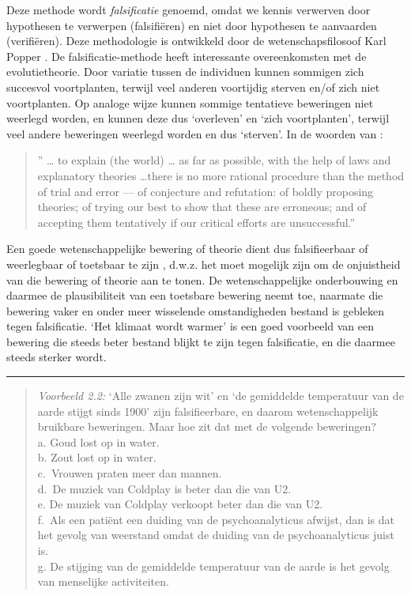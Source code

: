 \documentclass[
]{book}
\begin{document}
Deze methode wordt \emph{falsificatie} genoemd, omdat we kennis verwerven
door hypothesen te verwerpen (falsifiëren) en niet door hypothesen te
aanvaarden (verifiëren). Deze methodologie is ontwikkeld door de
wetenschapsfilosoof Karl Popper \citep{Popp35, Popp59, Popp63}. De
falsificatie-methode heeft interessante overeenkomsten met de
evolutietheorie. Door variatie tussen de individuen kunnen sommigen zich
succesvol voortplanten, terwijl veel anderen voortijdig sterven en/of
zich niet voortplanten. Op analoge wijze kunnen sommige tentatieve
beweringen niet weerlegd worden, en kunnen deze dus `overleven' en `zich
voortplanten', terwijl veel andere beweringen weerlegd worden en dus
`sterven'. In de woorden van \citep[p.51]{Popp63}:

\begin{quote}
'' \ldots{} to explain (the world) \ldots{} as far as possible, with the help of laws and explanatory theories \ldots there is no more rational procedure than the method of trial and error --- of conjecture and refutation: of boldly proposing theories; of trying our best to show that these are erroneous; and of accepting them tentatively if our critical efforts are unsuccessful.''
\end{quote}

Een goede wetenschappelijke bewering of theorie dient dus falsifieerbaar
of weerlegbaar of toetsbaar te zijn \citep{Popp63}, d.w.z. het moet mogelijk
zijn om de onjuistheid van die bewering of theorie aan te tonen. De
wetenschappelijke onderbouwing en daarmee de plausibiliteit van een
toetsbare bewering neemt toe, naarmate die bewering vaker en onder meer
wisselende omstandigheden bestand is gebleken tegen falsificatie. `Het
klimaat wordt warmer' is een goed voorbeeld van een bewering die steeds
beter bestand blijkt te zijn tegen falsificatie, en die daarmee steeds
sterker wordt.

\begin{center}\rule{0.5\linewidth}{0.5pt}\end{center}

\begin{quote}
\emph{Voorbeeld 2.2:} `Alle zwanen zijn wit' en
`de gemiddelde temperatuur van de aarde stijgt sinds 1900'
zijn falsifieerbare, en daarom wetenschappelijk bruikbare
beweringen. Maar hoe zit dat met de volgende beweringen?\\
a. Goud lost op in water.\\
b. Zout lost op in water.\\
c.~Vrouwen praten meer dan mannen.\\
d.~De muziek van Coldplay is beter dan die van U2.\\
e. De muziek van Coldplay verkoopt beter dan die van U2.\\
f.~Als een patiënt een duiding van de psychoanalyticus afwijst, dan is dat het gevolg van weerstand omdat de duiding van de
psychoanalyticus juist is.\\
g. De stijging van de gemiddelde temperatuur van de aarde is het gevolg van menselijke activiteiten.
\end{quote}
\end{document}

